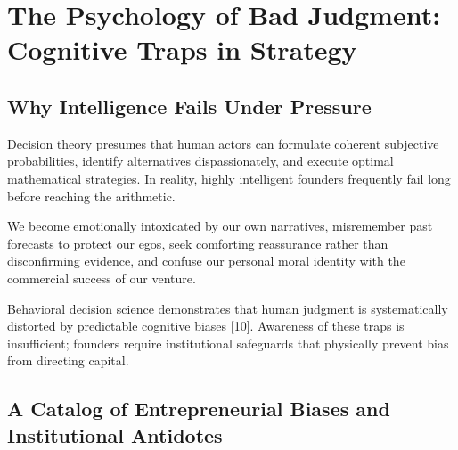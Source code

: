 \section{The Psychology of Bad Judgment: Cognitive Traps in Strategy}

\subsection{Why Intelligence Fails Under Pressure}

Decision theory presumes that human actors can formulate coherent subjective probabilities, identify alternatives dispassionately, and execute optimal mathematical strategies. In reality, highly intelligent founders frequently fail long before reaching the arithmetic.

We become emotionally intoxicated by our own narratives, misremember past forecasts to protect our egos, seek comforting reassurance rather than disconfirming evidence, and confuse our personal moral identity with the commercial success of our venture.

Behavioral decision science demonstrates that human judgment is systematically distorted by predictable cognitive biases [10]. Awareness of these traps is insufficient; founders require institutional safeguards that physically prevent bias from directing capital.

\subsection{A Catalog of Entrepreneurial Biases and Institutional Antidotes}

